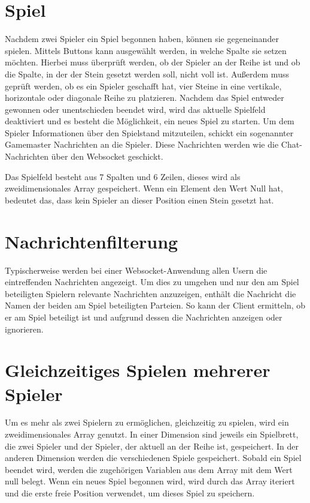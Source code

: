 \section{Spiel}\label{sec:Spiel}
Nachdem zwei Spieler ein Spiel begonnen haben, können sie gegeneinander spielen. Mittels Buttons kann ausgewählt werden, in welche Spalte sie setzen möchten. Hierbei muss überprüft werden, ob der Spieler an der Reihe ist und ob die Spalte, in der der Stein gesetzt werden soll, nicht voll ist. Außerdem muss geprüft werden, ob es ein Spieler geschafft hat, vier Steine in eine vertikale, horizontale oder diagonale Reihe zu platzieren. Nachdem das Spiel entweder gewonnen oder unentschieden beendet wird, wird das aktuelle Spielfeld deaktiviert und es besteht die Möglichkeit, ein neues Spiel zu starten. Um dem Spieler Informationen über den Spielstand mitzuteilen, schickt ein sogenannter Gamemaster Nachrichten an die Spieler.  Diese Nachrichten werden wie die Chat-Nachrichten über den Websocket geschickt.

Das Spielfeld besteht aus 7 Spalten und 6 Zeilen, dieses wird als zweidimensionales Array gespeichert. Wenn ein Element den Wert Null hat, bedeutet das, dass kein Spieler an dieser Position einen Stein gesetzt hat.
\section{Nachrichtenfilterung}\label{sec:Nachrichtenfilter}
Typischerweise werden bei einer Websocket-Anwendung allen Usern die eintreffenden Nachrichten angezeigt. Um dies zu umgehen und nur den am Spiel beteiligten Spielern relevante Nachrichten anzuzeigen, enthält die Nachricht die Namen der beiden am Spiel beteiligten Parteien. So kann der Client ermitteln, ob er am Spiel beteiligt ist und aufgrund dessen die Nachrichten anzeigen oder ignorieren. 

\section{Gleichzeitiges Spielen mehrerer Spieler}\label{sec:Multiplegames}
Um es mehr als zwei Spielern zu ermöglichen, gleichzeitig zu spielen, wird ein zweidimensionales Array genutzt. In einer Dimension sind jeweils ein Spielbrett, die zwei Spieler und der Spieler, der aktuell an der Reihe ist, gespeichert. In der anderen Dimension werden die verschiedenen Spiele gespeichert. Sobald ein Spiel beendet wird, werden die zugehörigen Variablen aus dem Array mit dem Wert null belegt. Wenn ein neues Spiel begonnen wird, wird durch das Array iteriert und die erste freie Position verwendet, um dieses Spiel zu speichern. 
